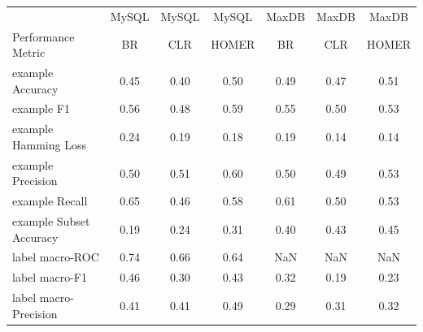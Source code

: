 \documentclass{acm_proc_article-sp}
\begin{document}
\begin{table}
\centering
\begin{tabular}{l|ccc|ccc}
\toprule
  & MySQL & MySQL & MySQL &                         MaxDB & MaxDB & MaxDB  \\ 
Performance Metric  & BR & CLR & HOMER &                              BR & CLR & HOMER \\      

\midrule

example Accuracy & 0.45 & 0.40 & 0.50 &           0.49  &  0.47  &  0.51 \\ 
                                                                            
example F1 & 0.56 & 0.48 & 0.59 &           0.55  &  0.50  &  0.53 \\ 
                                                                            
example Hamming Loss & 0.24 & 0.19 & 0.18 &        0.19  &  0.14  &  0.14 \\ 
                                                                            
example Precision & 0.50 & 0.51 & 0.60 &          0.50  &  0.49  &  0.53 \\ 
                                                                            
example Recall & 0.65 & 0.46 & 0.58 &             0.61  &  0.50  &  0.53 \\ 
                                                                            
example Subset Accuracy & 0.19 & 0.24 & 0.31 &     0.40  &  0.43  &  0.45 \\ 
      \hline                                                                      
label macro-ROC & 0.74 & 0.66 & 0.64 &            NaN  &  NaN  &  NaN    \\ 
                                                                            
label macro-F1 & 0.46 & 0.30 & 0.43 &             0.32  &  0.19  &  0.23 \\ 
                                                                            
label macro-Precision & 0.41 & 0.41 & 0.49 &      0.29  &  0.31  &  0.32 \\ 
                                                                            

\end{tabular}
\end{table}
\end{document}
